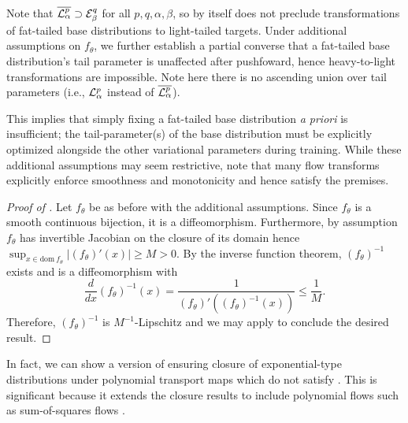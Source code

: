 \documentclass[../../thesis.tex]{subfiles}
\begin{document}
Note that $\overline{\mathcal{L}^p_\alpha} \supset \mathcal{E}^q_\beta$ for all $p,q,\alpha,\beta$, so 
by itself does not preclude transformations of fat-tailed base distributions to light-tailed targets.
Under additional assumptions on $f_\theta$, we further establish a partial converse that a fat-tailed base distribution's tail parameter is unaffected after pushfoward,
hence heavy-to-light transformations are impossible. Note here there is no ascending union over
tail parameters (i.e., $\mathcal{L}^p_\alpha$ instead of $\overline{\mathcal{L}^p_\alpha}$).


This implies that simply fixing a fat-tailed base
distribution \emph{a priori} is insufficient; the tail-parameter(s) of the base distribution must be explicitly optimized alongside
the other variational parameters during training.
While these additional assumptions may seem restrictive, note that many flow transforms
explicitly enforce smoothness and monotonicity \citep{wehenkel2019unconstrained,huang2018neural,durkan2019neural}
and hence satisfy the premises.

\begin{proof}[Proof of ]
  Let $f_\theta$ be as before with the additional assumptions.
  Since $f_\theta$ is a smooth continuous bijection, it is a diffeomorphism.
  Furthermore, by assumption $f_\theta$ has invertible Jacobian on the closure of its
  domain hence $\sup_{x \in \text{dom}~f_\theta} \lvert (f_\theta)'(x) \rvert \geq M > 0$.
  By the inverse function theorem, $(f_\theta)^{-1}$ exists and is
  a diffeomorphism with
  \[
    \frac{d}{dx}(f_\theta)^{-1}(x) = \frac{1}{(f_\theta)'((f_\theta)^{-1}(x))} \leq \frac{1}{M} .
  \]
  Therefore, $(f_\theta)^{-1}$ is $M^{-1}$-Lipschitz and we may apply
   to conclude the desired result.
\end{proof}


In fact, we can show a version of  ensuring closure of exponential-type
distributions under polynomial transport maps which do not satisfy .
This is significant because it extends the closure results to
include polynomial flows such as sum-of-squares flows \citep{jaini2019sum}.
\end{document}

